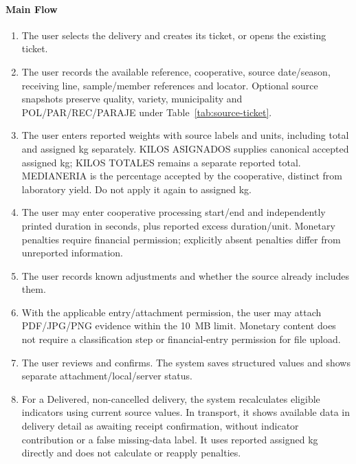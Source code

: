\paragraph{Main Flow}
\begin{enumerate}
\item The user selects the delivery and creates its ticket, or opens the existing ticket.
\item The user records the available reference, cooperative, source date/season, receiving line, sample/member references and locator. Optional source snapshots preserve quality, variety, municipality and POL/PAR/REC/PARAJE under Table~\ref{tab:source-ticket}.
\item The user enters reported weights with source labels and units, including total and assigned kg separately. KILOS ASIGNADOS supplies canonical accepted assigned kg; KILOS TOTALES remains a separate reported total. MEDIANERIA is the percentage accepted by the cooperative, distinct from laboratory yield. Do not apply it again to assigned kg.
\item The user may enter cooperative processing start/end and independently printed duration in seconds, plus reported excess duration/unit. Monetary penalties require financial permission; explicitly absent penalties differ from unreported information.
\item The user records known adjustments and whether the source already includes them.
\item With the applicable entry/attachment permission, the user may attach PDF/JPG/PNG evidence within the 10~MB limit. Monetary content does not require a classification step or financial-entry permission for file upload.
\item The user reviews and confirms. The system saves structured values and shows separate attachment/local/server status.
\item For a Delivered, non-cancelled delivery, the system recalculates eligible indicators using current source values. In transport, it shows available data in delivery detail as awaiting receipt confirmation, without indicator contribution or a false missing-data label. It uses reported assigned kg directly and does not calculate or reapply penalties.
\end{enumerate}

